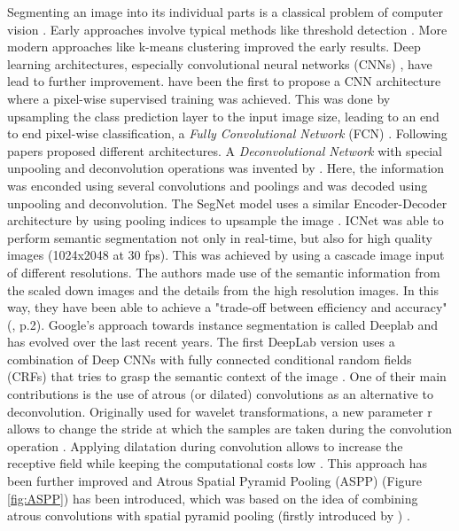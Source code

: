 \documentclass[11pt,
  paper=a4, 
  bibliography=totocnumbered,
	captions=tableheading,
	BCOR=10mm
]{scrreprt}
\theoremstyle{definition}
\newcommand{\figref}[1]{(Figure \ref{#1})}
\begin{document}
Segmenting an image into its individual parts is a classical problem of computer vision \cite{Szeliski2011}. 
Early approaches involve typical methods like threshold detection \cite{Smith1979}.
More modern approaches like k-means clustering \cite{Dhanachandra2015} improved the early results.
Deep learning architectures, especially convolutional neural networks (CNNs) \cite{Fukushima1980}, have lead to further improvement.
\textcite{Shelhamer2017} have been the first to propose a CNN architecture where a pixel-wise supervised training was achieved. 
This was done by upsampling the class prediction layer to the input image size, leading to an end to end pixel-wise classification, a \textit{Fully Convolutional Network} (FCN) \cite{Shelhamer2017}.
Following papers proposed different architectures.
A \textit{Deconvolutional Network} with special unpooling and deconvolution operations was invented by \textcite{Noh2015}. 
Here, the information was enconded using several convolutions and poolings and was decoded using unpooling and deconvolution.
The SegNet model uses a similar Encoder-Decoder architecture by using pooling indices to upsample the image \cite{Badrinarayanan2017}.
ICNet \cite{Zhao2017} was able to perform semantic segmentation not only in real-time, but also for high quality images (1024x2048 at 30 fps). 
This was achieved by using a cascade image input of different resolutions. 
The authors made use of the semantic information from the scaled down images and the details from the high resolution images.
In this way, they have been able to achieve a "trade-off between efficiency and accuracy" (\cite{Zhao2017}, p.2).
Google's approach towards instance segmentation is called Deeplab and has evolved over the last recent years.
The first DeepLab version uses a combination of Deep CNNs with fully connected conditional random fields (CRFs) that tries to grasp the semantic context of the image \cite{Chen2016}. 
One of their main contributions is the use of atrous (or dilated) convolutions as an alternative to deconvolution. 
Originally used for wavelet transformations, a new parameter r allows to change the stride at which the samples are taken during the convolution operation \cite{Chen2016}.
Applying dilatation during convolution allows to increase the receptive field while keeping the computational costs low \cite{Minaee2020}.
This approach has been further improved and Atrous Spatial Pyramid Pooling (ASPP) \figref{fig:ASPP} has been introduced, which was based on the idea of combining atrous convolutions with spatial pyramid pooling (firstly introduced by \textcite{He2014}) \cite{Chen2018}.
\end{document}
